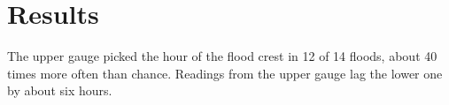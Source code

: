 \section{Results}
The upper gauge picked the hour of the flood crest in 12 of 14 floods, about 40 times more often than chance. Readings from the upper gauge lag the lower one by about six hours.
